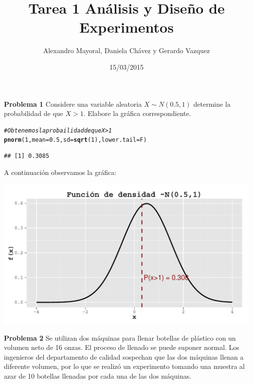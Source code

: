 \documentclass[a4paper]{scrartcl}\usepackage[]{graphicx}\usepackage[]{color}
\author{Alexandro Mayoral, Daniela Chávez y Gerardo Vazquez}
\title{Tarea 1 Análisis y Diseño de Experimentos}
\date{15/03/2015}
\makeatletter
\def\maxwidth{ %
  \ifdim\Gin@nat@width>\linewidth
    \linewidth
  \else
    \Gin@nat@width
  \fi
}
\newcommand{\hlnum}[1]{\textcolor[rgb]{0.686,0.059,0.569}{#1}}%
\newcommand{\hlcom}[1]{\textcolor[rgb]{0.678,0.584,0.686}{\textit{#1}}}%
\newcommand{\hlstd}[1]{\textcolor[rgb]{0.345,0.345,0.345}{#1}}%
\newcommand{\hlkwc}[1]{\textcolor[rgb]{0.333,0.667,0.333}{#1}}%
\newcommand{\hlkwd}[1]{\textcolor[rgb]{0.737,0.353,0.396}{\textbf{#1}}}%
\newenvironment{kframe}{%
 \def\at@end@of@kframe{}%
 \ifinner\ifhmode%
  \def\at@end@of@kframe{\end{minipage}}%
  \begin{minipage}{\columnwidth}%
 \fi\fi%
 \def\FrameCommand##1{\hskip\@totalleftmargin \hskip-\fboxsep
 \colorbox{shadecolor}{##1}\hskip-\fboxsep
     \hskip-\linewidth \hskip-\@totalleftmargin \hskip\columnwidth}%
 \MakeFramed {\advance\hsize-\width
   \@totalleftmargin\z@ \linewidth\hsize
   \@setminipage}}%
 {\par\unskip\endMakeFramed%
 \at@end@of@kframe}
\newenvironment{knitrout}{}{} %
\makeatother
\begin{document}
\maketitle




\textbf{Problema 1}
Considere una variable aleatoria $X \sim N(0.5, 1)$ determine la probabilidad de que $X>1$. Elabore la gráfica correspondiente.

\begin{knitrout}
\color{fgcolor}\begin{kframe}
\begin{alltt}
\hlcom{# Obtenemos la probailidad de que X > 1}
\hlkwd{pnorm}\hlstd{(}\hlnum{1}\hlstd{,} \hlkwc{mean} \hlstd{=} \hlnum{0.5}\hlstd{,} \hlkwc{sd} \hlstd{=} \hlkwd{sqrt}\hlstd{(}\hlnum{1}\hlstd{),} \hlkwc{lower.tail} \hlstd{= F)}
\end{alltt}
\begin{verbatim}
## [1] 0.3085
\end{verbatim}
\end{kframe}
\end{knitrout}

\noindent A continuación observamos la gráfica:\\

\begin{knitrout}
\color{fgcolor}

{\centering \includegraphics[width=\maxwidth]{figure/unnamed-chunk-3} 

}



\end{knitrout}

\newpage
\textbf{Problema 2}
Se utilizan dos máquinas para llenar botellas de plástico con un volumen neto de 16 onzas. El proceso de llenado se puede suponer normal. Los ingenieros del departamento de calidad sospechan que las dos máquinas llenan a diferente volumen, por lo que se realizó un experimento tomando una muestra al azar de 10 botellas llenadas por cada una de las dos máquinas.
\end{document}
